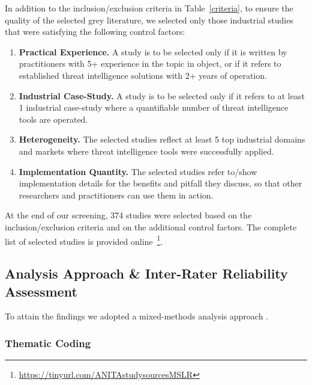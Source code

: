 In addition to the inclusion/exclusion criteria in Table~\ref{criteria}, to ensure the quality of the selected grey literature, we selected only those industrial studies that were satisfying the following control factors:
\begin{enumerate}
\item \textbf{Practical Experience.} A study is to be selected only if it is written by practitioners with 5+ experience in the topic in object, or if it refers to established threat intelligence solutions with 2+ years of operation.
\item \textbf{Industrial Case-Study.} A study is to be selected only if it refers to at least 1 industrial case-study where a quantifiable number of threat intelligence tools are operated.
\item \textbf{Heterogeneity.} The selected studies reflect at least 5 top industrial domains and markets where threat intelligence tools were successfully applied.
\item \textbf{Implementation Quantity.} The selected studies refer to/show implementation details for the benefits and pitfall they discuss, so that other researchers and practitioners can use them in action.
\end{enumerate}


At the end of our screening, 374 studies were selected based on the inclusion/exclusion criteria and on the additional control factors. 
The complete list of selected studies is provided online~\footnote{\url{https://tinyurl.com/ANITAstudysourcesMSLR}}.

\subsection{Analysis Approach \& Inter-Rater Reliability Assessment}\label{sec:inter-rater-assessment}

To attain the findings we adopted a mixed-methods analysis approach \cite{JohOnw04}. 

\subsubsection{Thematic Coding}

